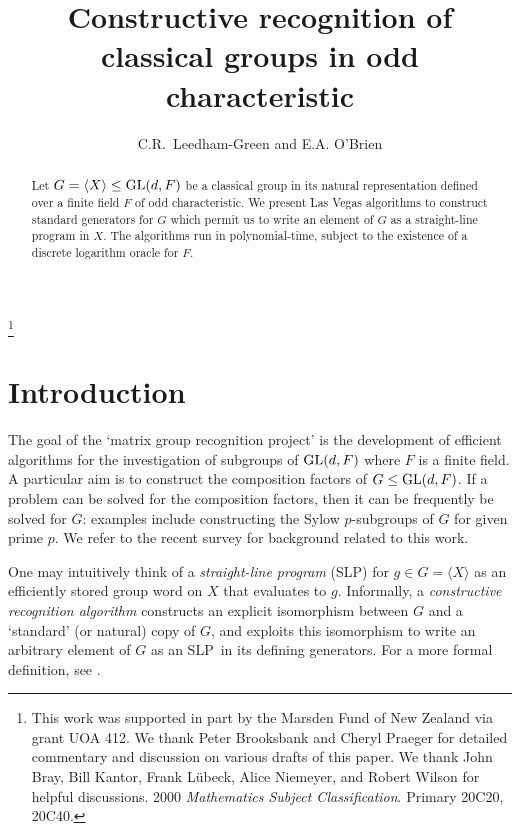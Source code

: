 \documentclass[12pt]{article}
\def\GL{{\rm GL}}
\def\SLP{{\rm SLP}}
\begin{document}
\title{Constructive recognition of classical groups in odd characteristic} 
\author{C.R.\ Leedham-Green and E.A. O'Brien}
\date{}
\maketitle

\begin{abstract}
Let $G = \langle X \rangle \leq \GL(d, F)$ be 
a classical group in its natural representation 
defined over a finite field $F$ of odd characteristic. 
We present Las Vegas algorithms to construct
standard generators for $G$ which permit us 
to write an element of $G$ as a straight-line
program in $X$. The algorithms run in polynomial-time, 
subject to the existence of a discrete logarithm oracle for $F$. 
\end{abstract}

\footnote{This work was supported in part by the Marsden Fund of
New Zealand via grant UOA 412. We thank Peter Brooksbank
and Cheryl Praeger for detailed commentary and discussion on various drafts
of this paper. We thank John Bray,  Bill Kantor, 
Frank L\"ubeck, Alice Niemeyer, and 
Robert Wilson for helpful discussions. 
2000 {\it Mathematics Subject Classification}.
Primary 20C20, 20C40.}

\section{Introduction}
\label{intro}

The goal of the `matrix group recognition project'
is the development of efficient
algorithms for the investigation of 
subgroups of $\GL(d, F)$ where $F$ 
is a finite field. 
A particular aim is to 
construct the composition factors
of $G \leq \GL(d, F)$. If a problem
can be solved for the composition factors,
then it can be frequently be solved for $G$:
examples include constructing the 
Sylow $p$-subgroups of $G$ for given prime $p$.
We refer to the recent survey \cite{OBrien05}
for background related to this work.

One may intuitively think of a {\it straight-line program} (\SLP)
for $g \in G = \langle X \rangle$ as an efficiently stored group word
on $X$ that evaluates to $g$.  
Informally, a {\it constructive recognition algorithm}
constructs an explicit isomorphism
between $G$ and a `standard' (or natural)
copy of $G$, and exploits this isomorphism
to write an arbitrary element of $G$ as
an \SLP\ in its defining generators. 
For a more formal definition, see \cite[p. 192]{Seress03}.
\end{document}
